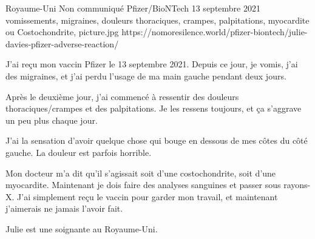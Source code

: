           {Royaume-Uni}
          {Non communiqué}
          {Pfizer/BioNTech}
          {13 septembre 2021}
          {
            vomissements,
            migraines,
            douleurs thoraciques,
            crampes,
            palpitations,
            myocardite ou Costochondrite,
          }
          {picture.jpg}
          {https://nomoresilence.world/pfizer-biontech/julie-davies-pfizer-adverse-reaction/}
          {


J'ai reçu mon vaccin Pfizer le 13 septembre 2021. Depuis ce jour, je vomis, j'ai
des migraines, et j'ai perdu l'usage de ma main gauche pendant deux jours.

Après le deuxième jour, j'ai commencé à ressentir des douleurs
thoraciques/crampes et des palpitations. Je les ressens toujours, et ça
s'aggrave un peu plus chaque jour.

J'ai la sensation d'avoir quelque chose qui bouge en dessous de mes côtes du
côté gauche. La douleur est parfois horrible.

Mon docteur m'a dit qu'il s'agissait soit d'une costochondrite, soit d'une
myocardite. Maintenant je dois faire des analyses sanguines et passer sous
rayons-X. J'ai simplement reçu le vaccin pour garder mon travail, et maintenant
j'aimerais ne jamais l'avoir fait.

Julie est une soignante au Royaume-Uni.

}
